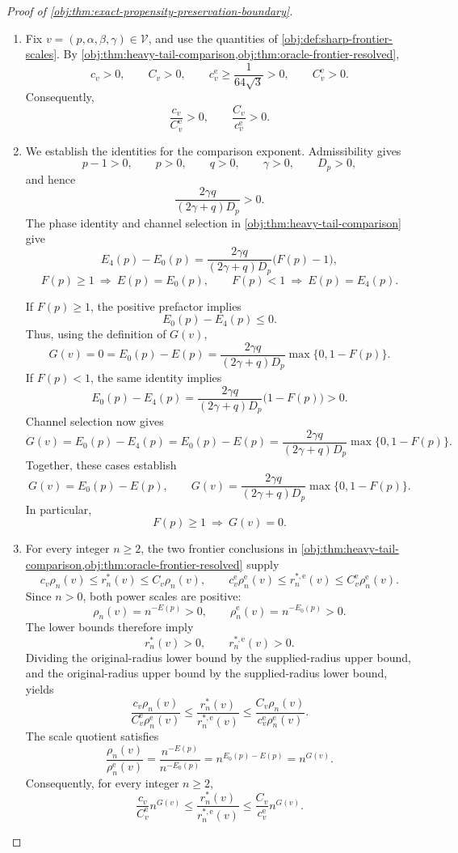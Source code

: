\begin{proof}[Proof of \cref{obj:thm:exact-propensity-preservation-boundary}]
\begin{enumerate}
\item Fix \(v=(p,\alpha,\beta,\gamma)\in\mathcal V\), and use the quantities of \cref{obj:def:sharp-frontier-scales}. By \cref{obj:thm:heavy-tail-comparison,obj:thm:oracle-frontier-resolved},
\[
c_v>0,\qquad C_v>0,\qquad
c^{\mathrm e}_v\ge\frac{1}{64\sqrt3}>0,\qquad
C^{\mathrm e}_v>0.
\]
Consequently,
\[
\frac{c_v}{C^{\mathrm e}_v}>0,
\qquad
\frac{C_v}{c^{\mathrm e}_v}>0.
\]

\item We establish the identities for the comparison exponent. Admissibility gives
\[
p-1>0,\qquad p>0,\qquad q>0,\qquad
\gamma>0,\qquad D_p>0,
\]
and hence
\[
\frac{2\gamma q}{(2\gamma+q)D_p}>0.
\]
The phase identity and channel selection in \cref{obj:thm:heavy-tail-comparison} give
\[
E_4(p)-E_0(p)
=
\frac{2\gamma q}{(2\gamma+q)D_p}\bigl(F(p)-1\bigr),
\]
\[
F(p)\ge1\ \Longrightarrow\ E(p)=E_0(p),
\qquad
F(p)<1\ \Longrightarrow\ E(p)=E_4(p).
\]

If \(F(p)\ge1\), the positive prefactor implies
\[
E_0(p)-E_4(p)\le0.
\]
Thus, using the definition of \(G(v)\),
\[
G(v)=0=E_0(p)-E(p)
=
\frac{2\gamma q}{(2\gamma+q)D_p}\max\{0,1-F(p)\}.
\]
If \(F(p)<1\), the same identity implies
\[
E_0(p)-E_4(p)
=
\frac{2\gamma q}{(2\gamma+q)D_p}\bigl(1-F(p)\bigr)>0.
\]
Channel selection now gives
\[
G(v)=E_0(p)-E_4(p)=E_0(p)-E(p)
=
\frac{2\gamma q}{(2\gamma+q)D_p}\max\{0,1-F(p)\}.
\]
Together, these cases establish
\[
G(v)=E_0(p)-E(p),
\qquad
G(v)=
\frac{2\gamma q}{(2\gamma+q)D_p}\max\{0,1-F(p)\}.
\]
In particular,
\[
F(p)\ge1\ \Longrightarrow\ G(v)=0.
\]

\item For every integer \(n\ge2\), the two frontier conclusions in
\cref{obj:thm:heavy-tail-comparison,obj:thm:oracle-frontier-resolved} supply
\[
c_v\rho_n(v)\le r_n^*(v)\le C_v\rho_n(v),
\qquad
c^{\mathrm e}_v\rho_n^{\mathrm e}(v)
\le r_n^{*,\mathrm e}(v)
\le C^{\mathrm e}_v\rho_n^{\mathrm e}(v).
\]
Since \(n>0\), both power scales are positive:
\[
\rho_n(v)=n^{-E(p)}>0,
\qquad
\rho_n^{\mathrm e}(v)=n^{-E_0(p)}>0.
\]
The lower bounds therefore imply
\[
r_n^*(v)>0,\qquad r_n^{*,\mathrm e}(v)>0.
\]
Dividing the original-radius lower bound by the supplied-radius upper bound, and the original-radius upper bound by the supplied-radius lower bound, yields
\[
\frac{c_v\rho_n(v)}
     {C^{\mathrm e}_v\rho_n^{\mathrm e}(v)}
\le
\frac{r_n^*(v)}{r_n^{*,\mathrm e}(v)}
\le
\frac{C_v\rho_n(v)}
     {c^{\mathrm e}_v\rho_n^{\mathrm e}(v)}.
\]
The scale quotient satisfies
\[
\frac{\rho_n(v)}{\rho_n^{\mathrm e}(v)}
=
\frac{n^{-E(p)}}{n^{-E_0(p)}}
=
n^{E_0(p)-E(p)}
=
n^{G(v)}.
\]
Consequently, for every integer \(n\ge2\),
\[
\frac{c_v}{C^{\mathrm e}_v}n^{G(v)}
\le
\frac{r_n^*(v)}{r_n^{*,\mathrm e}(v)}
\le
\frac{C_v}{c^{\mathrm e}_v}n^{G(v)}.
\]


\end{enumerate}
\end{proof}
